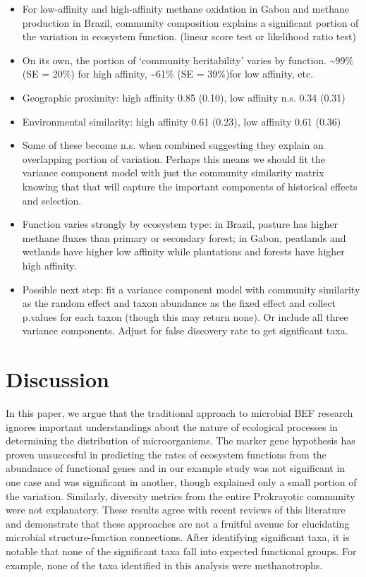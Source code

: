 \documentclass{article}
\begin{document}
\begin{itemize}
  \item For low-affinity and high-affinity methane oxidation in Gabon and
    methane production in Brazil, community composition explains a significant
    portion of the variation in ecosystem function. (linear score test or
    likelihood ratio test)
  \item On its own, the portion of `community heritability' varies by function.
    \textasciitilde99\% (SE = 20\%) for high affinity, \textasciitilde61\% (SE =
    39\%)for low affinity, etc. 
  \item Geographic proximity: high affinity 0.85 (0.10), low affinity n.s. 0.34
    (0.31)
  \item Environmental similarity: high affinity 0.61 (0.23), low affinity 0.61 (0.36) 
  \item Some of these become n.s. when combined suggesting they explain an
    overlapping portion of variation. Perhaps this means we should fit the
    variance component model with just the community similarity matrix knowing
    that that will capture the important components of historical effects and
    selection.
  \item Function varies strongly by ecosystem type: in Brazil, pasture has
    higher methane fluxes than primary or secondary forest; in Gabon, peatlands
    and wetlands have higher low affinity while plantations and forests have
    higher high affinity.
  \item Possible next step: fit a variance component model with community
    similarity as the random effect and taxon abundance as the fixed effect and
    collect p.values for each taxon (though this may return none). Or include
    all three variance components. Adjust for false discovery rate to get
    significant taxa.
\end{itemize}

\section{Discussion}

In this paper, we argue that the traditional approach to microbial BEF research
ignores important understandings about the nature of ecological processes in
determining the distribution of microorganisms. The marker gene hypothesis has
proven unsuccesful in predicting the rates of ecosystem functions from the
abundance of functional genes and in our example study was not significant in one case and
was significant in another, though explained only a small portion of the variation.
Similarly, diversity metrics from the entire Prokrayotic community were not
explanatory. These results agree with recent reviews of this literature and
demonstrate that these approaches are not a fruitful avenue for elucidating
microbial structure-function connections. After identifying significant taxa,
it is notable that none of the significant taxa fall into expected functional
groups. For example, none of the taxa identified in this analysis were
methanotrophs.
\end{document}
